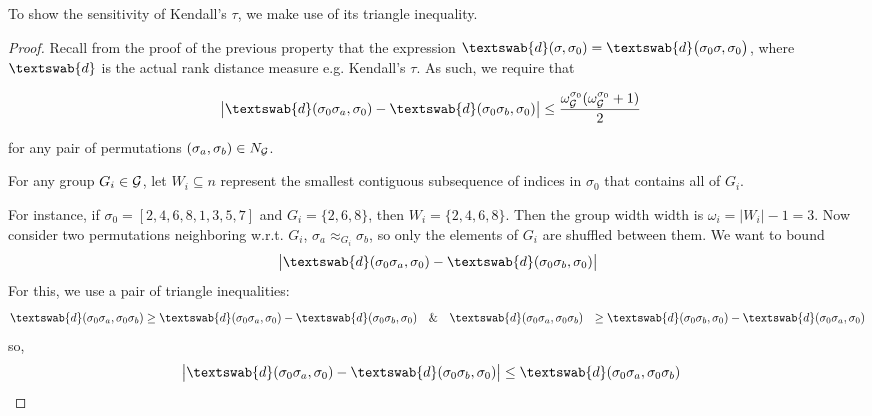  

To show the sensitivity of Kendall's $\tau$, we make use of its triangle inequality. 

 \begin{proof}
 Recall from the proof of the previous property that the expression $\textswab{d}(\sigma, \sigma_0) = \textswab{d}\big( \sigma_0\sigma, \sigma_0 \big)$, where $\textswab{d}$ is the actual rank distance measure e.g. Kendall's $\tau$. As such, we require that 
 
 \begin{align*}
     \big|  \textswab{d}(\sigma_0\sigma_a, \sigma_0) - \textswab{d}(\sigma_0\sigma_b, \sigma_0) \big|
     &\leq \frac{\omega_{\calG}^{\sigma_0}(\omega_{\calG}^{\sigma_0} + 1)}{2}
 \end{align*}

for any pair of permutations $(\sigma_a, \sigma_b) \in N_{\mathcal{G}}$. 
 
 For any group $G_i \in \mathcal{G}$, let $W_i \subseteq n$ represent the smallest contiguous subsequence of indices in $\sigma_0$ that contains all of $G_i$. 

For instance, if $\sigma_0 = [2,4,6,8,1,3,5,7]$ and $G_i = \{2,6,8\}$, then $W_i = \{2,4,6,8\}$. Then the group width width is $\omega_i = |W_i| - 1 = 3$. Now consider two permutations neighboring w.r.t. $G_i$, $\sigma_a \approx_{G_i} \sigma_b$, so only the elements of $G_i$ are shuffled between them. We want to bound 
\begin{align*}
    \big|  \textswab{d}(\sigma_0\sigma_a, \sigma_0) - \textswab{d}(\sigma_0\sigma_b, \sigma_0) \big| 
\end{align*}
For this, we use a pair of triangle inequalities: 
\begin{align*}
    \textswab{d}(\sigma_0\sigma_a, \sigma_0\sigma_b) 
    &\geq \textswab{d}(\sigma_0\sigma_a, \sigma_0) - \textswab{d}(\sigma_0\sigma_b, \sigma_0) 
    \quad \& \quad 
    \textswab{d}(\sigma_0\sigma_a, \sigma_0\sigma_b) 
    &\geq \textswab{d}(\sigma_0\sigma_b, \sigma_0) - \textswab{d}(\sigma_0\sigma_a, \sigma_0)
\end{align*}
so, 
\begin{align*}
     \big|  \textswab{d}(\sigma_0\sigma_a, \sigma_0) - \textswab{d}(\sigma_0\sigma_b, \sigma_0) \big| &\leq \textswab{d}(\sigma_0\sigma_a, \sigma_0\sigma_b)
\end{align*}



\end{proof}
